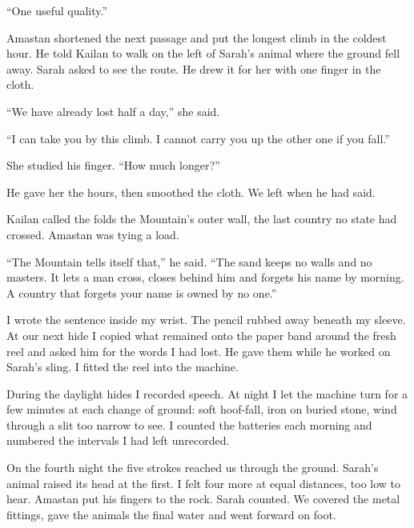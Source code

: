 ``One useful quality.''\par

Amastan shortened the next passage and put the longest climb in the coldest hour. He told Kailan to walk on the left of Sarah's animal where the ground fell away. Sarah asked to see the route. He drew it for her with one finger in the cloth.\par

``We have already lost half a day,'' she said.\par

``I can take you by this climb. I cannot carry you up the other one if you fall.''\par

She studied his finger. ``How much longer?''\par

He gave her the hours, then smoothed the cloth. We left when he had said.\par

Kailan called the folds the Mountain's outer wall, the last country no state had crossed. Amastan was tying a load.\par

``The Mountain tells itself that,'' he said. ``The sand keeps no walls and no masters. It lets a man cross, closes behind him and forgets his name by morning. A country that forgets your name is owned by no one.''\par

I wrote the sentence inside my wrist. The pencil rubbed away beneath my sleeve. At our next hide I copied what remained onto the paper band around the fresh reel and asked him for the words I had lost. He gave them while he worked on Sarah's sling. I fitted the reel into the machine.\par

During the daylight hides I recorded speech. At night I let the machine turn for a few minutes at each change of ground: soft hoof-fall, iron on buried stone, wind through a slit too narrow to see. I counted the batteries each morning and numbered the intervals I had left unrecorded.\par

On the fourth night the five strokes reached us through the ground. Sarah's animal raised its head at the first. I felt four more at equal distances, too low to hear. Amastan put his fingers to the rock. Sarah counted. We covered the metal fittings, gave the animals the final water and went forward on foot.\par

